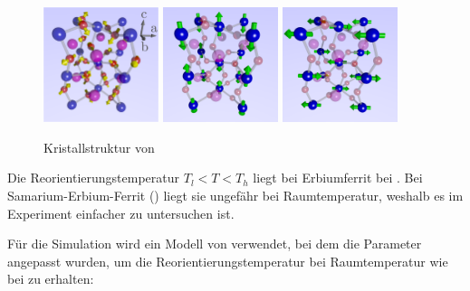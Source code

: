 \documentclass[main.tex]{subfiles}
\begin{document}
\begin{figure}[H]
	\centering
	{\includegraphics[width=0.3\textwidth]{bilder/jschlege/UnitCell_withDMI_labeled.png}}
	{\includegraphics[width=0.3\textwidth]{bilder/jschlege/UnitCell_belowRT.png}}
	{\includegraphics[width=0.3\textwidth]{bilder/jschlege/UnitCell_aboveRT.png}}
	\caption{ Kristallstruktur von 
		\cite{schlegel-master}}
	\label{fig:orthoferrit2}
\end{figure}


Die Reorientierungstemperatur \(T_l < T < T_h\) liegt bei Erbiumferrit bei . Bei Samarium-Erbium-Ferrit () liegt sie ungefähr bei Raumtemperatur, weshalb es im Experiment einfacher zu untersuchen ist.


Für die Simulation wird ein Modell von  verwendet, bei dem die Parameter  angepasst wurden, um die Reorientierungstemperatur bei Raumtemperatur wie bei  zu erhalten:
\end{document}

